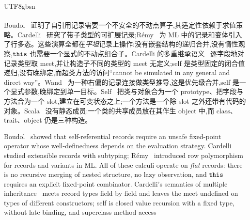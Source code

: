 \begin{CJK*}{UTF8}{gbsn}
\paragraph{}
\ifPaperChinese
Boudol~\cite{boudol2004-recursive-record-semantics} 证明了自引用记录需要一个不安全的不动点算子,其适定性依赖于求值策略。Cardelli~\cite{cardelli1992-extensible-records} 研究了带子类型的可扩展记录;Rémy~\cite{remy1989-row-polymorphism} 为 ML 中的记录和变体引入了行多态。这些演算全都在\emph{平坦}记录上操作:没有嵌套结构的递归合并,没有惰性观察,$\mathtt{this}$ 也需要一个显式的不动点组合子。Cardelli 的多重继承语义~\cite{cardelli1988-multiple-inheritance-semantics} 逐字段地对记录类型取 meet,并让构造子不同的类型的 meet 无定义;self 是类型固定的闭合值递归,没有晚绑定,而超类方法的访问“cannot be simulated in any general and direct way”。Wand~\cite{wand1991-record-concatenation-inference} 为一种右偏的记录连接做类型推导,这是优先级合并,self 是一个显式参数,晚绑定到单一目标。Self~\cite{ungar1987-self-language} 把类与对象合为一个 prototype、把字段与方法合为一个 slot,建立在可变状态之上;一个方法是一个除 slot 之外还带有代码的对象。Scala~\cite{odersky2004-scala-overview} 没有静态成员:一个类的共享成员放在其伴生 object 中,而 class、trait、object 仍是三种构造。
\else
\begin{sloppypar}
Boudol~\cite{boudol2004-recursive-record-semantics} showed that self-referential
records require an unsafe fixed-point operator whose
well-definedness depends on the evaluation strategy.
Cardelli~\cite{cardelli1992-extensible-records} studied extensible records
with subtyping;
R\'emy~\cite{remy1989-row-polymorphism} introduced row polymorphism for
records and variants in ML.
All of these calculi operate on \emph{flat} records: there is
no recursive merging of nested structure, no lazy observation,
and $\mathtt{this}$ requires an explicit fixed-point combinator.
Cardelli's semantics of multiple
inheritance~\cite{cardelli1988-multiple-inheritance-semantics} meets
record types field by field and leaves the meet undefined on types
of different constructors; self is closed value recursion with a
fixed type, without late binding, and superclass method access

\end{sloppypar}
\end{CJK*}
